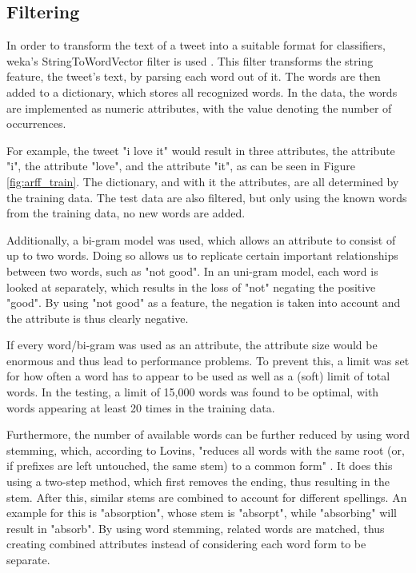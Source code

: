 \subsection{Filtering}
In order to transform the text of a tweet into a suitable format for classifiers, weka's StringToWordVector filter is used \cite{weka}. This filter transforms the string feature, the tweet's text, by parsing each word out of it. The words are then added to a dictionary, which stores all recognized words. In the data, the words are implemented as numeric attributes, with the value denoting the number of occurrences.

For example, the tweet "i love it" would result in three attributes, the attribute "i", the attribute "love", and the attribute "it", as can be seen in Figure \ref{fig:arff_train}. The dictionary, and with it the attributes, are all determined by the training data. The test data are also filtered, but only using the known words from the training data, no new words are added. 


Additionally, a bi-gram model was used, which allows an attribute to consist of up to two words. Doing so allows us to replicate certain important relationships between two words, such as "not good". In an uni-gram model, each word is looked at separately, which results in the loss of "not" negating the positive "good". By using "not good" as a feature, the negation is taken into account and the attribute is thus clearly negative.

If every word/bi-gram was used as an attribute, the attribute size would be enormous and thus lead to performance problems. To prevent this, a limit was set for how often a word has to appear to be used as well as a (soft) limit of total words. In the testing, a limit of 15,000 words was found to be optimal, with words appearing at least 20 times in the training data.

Furthermore, the number of available words can be further reduced by using word stemming, which, according to Lovins, "reduces all words with the same root (or, if prefixes are left untouched, the same stem) to a common form" \cite[p.~22]{Lovins1968DevelopmentOA}. It does this using a two-step method, which first removes the ending, thus resulting in the stem. After this, similar stems are combined to account for different spellings. An example for this is "absorption", whose stem is "absorpt", while "absorbing" will result in "absorb". By using word stemming, related words are matched, thus creating combined attributes instead of considering each word form to be separate.


